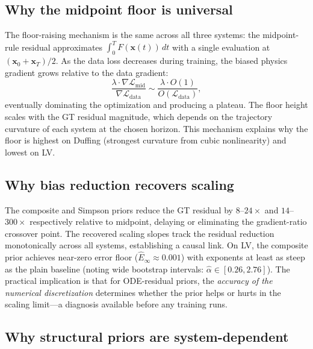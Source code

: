 \documentclass[11pt]{article}
\begin{document}
\subsection{Why the midpoint floor is universal}

The floor-raising mechanism is the same across all three systems: the midpoint-rule residual approximates $\int_0^T F(\bm{x}(t))\,dt$ with a single evaluation at $(\bm{x}_0 + \bm{x}_T)/2$.
As the data loss decreases during training, the biased physics gradient grows relative to the data gradient:
\[
\frac{\lambda \cdot \nabla \mathcal{L}_{\mathrm{mid}}}{\nabla \mathcal{L}_{\mathrm{data}}} \sim \frac{\lambda \cdot O(1)}{O(\mathcal{L}_{\mathrm{data}})},
\]
eventually dominating the optimization and producing a plateau.
The floor height scales with the GT residual magnitude, which depends on the trajectory curvature of each system at the chosen horizon.
This mechanism explains why the floor is highest on Duffing (strongest curvature from cubic nonlinearity) and lowest on LV.

\subsection{Why bias reduction recovers scaling}

The composite and Simpson priors reduce the GT residual by $8$--$24\times$ and $14$--$300\times$ respectively relative to midpoint, delaying or eliminating the gradient-ratio crossover point.
The recovered scaling slopes track the residual reduction monotonically across all systems, establishing a causal link.
On LV, the composite prior achieves near-zero error floor ($\hat{E}_\infty \approx 0.001$) with exponents at least as steep as the plain baseline (noting wide bootstrap intervals: $\hat{\alpha} \in [0.26, 2.76]$).
The practical implication is that for ODE-residual priors, the \emph{accuracy of the numerical discretization} determines whether the prior helps or hurts in the scaling limit---a diagnosis available before any training runs.

\subsection{Why structural priors are system-dependent}
\end{document}
